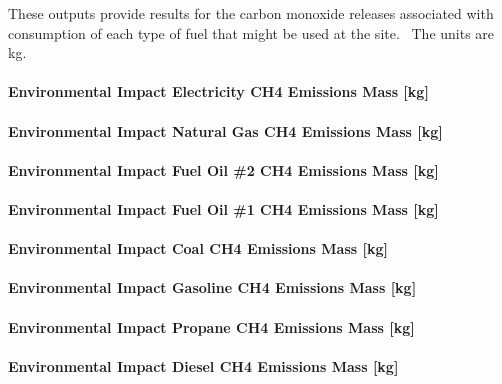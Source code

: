 These outputs provide results for the carbon monoxide releases associated with consumption of each type of fuel that might be used at the site.~ The units are kg.

\paragraph{Environmental Impact Electricity CH4 Emissions Mass {[}kg{]}}\label{environmental-impact-electricity-ch4-emissions-mass-kg}

\paragraph{Environmental Impact Natural Gas CH4 Emissions Mass {[}kg{]}}\label{environmental-impact-natural-gas-ch4-emissions-mass-kg}

\paragraph{Environmental Impact Fuel Oil \#2 CH4 Emissions Mass {[}kg{]}}\label{environmental-impact-fuel-oil-2-ch4-emissions-mass-kg}

\paragraph{Environmental Impact Fuel Oil \#1 CH4 Emissions Mass {[}kg{]}}\label{environmental-impact-fuel-oil-1-ch4-emissions-mass-kg}

\paragraph{Environmental Impact Coal CH4 Emissions Mass {[}kg{]}}\label{environmental-impact-coal-ch4-emissions-mass-kg}

\paragraph{Environmental Impact Gasoline CH4 Emissions Mass {[}kg{]}}\label{environmental-impact-gasoline-ch4-emissions-mass-kg}

\paragraph{Environmental Impact Propane CH4 Emissions Mass {[}kg{]}}\label{environmental-impact-propane-ch4-emissions-mass-kg}

\paragraph{Environmental Impact Diesel CH4 Emissions Mass {[}kg{]}}\label{environmental-impact-diesel-ch4-emissions-mass-kg}

